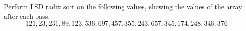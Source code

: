  Perform LSD radix sort on the following values, showing the
  values of the array after each pass:
  \[
    121, 23, 231, 89, 123, 536, 697, 457, 355, 243, 657, 345, 174, 248, 346, 376
  \]
